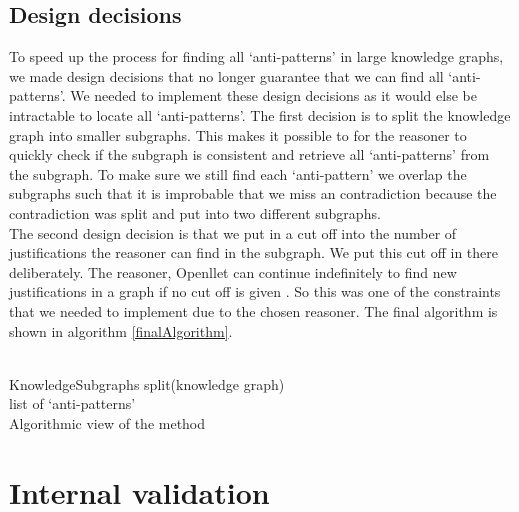 \documentclass[11pt,letterpaper ,oneside ]{book}
\begin{document}
	\section{Design decisions}
	To speed up the process for finding all `anti-patterns' in large knowledge graphs, we made design decisions that no longer guarantee that we can find all `anti-patterns'. We needed to implement these design decisions as it would else be intractable to locate all `anti-patterns'. 
	The first decision is to split the knowledge graph into smaller subgraphs. This makes it possible to for the reasoner to quickly check if the subgraph is consistent and retrieve all `anti-patterns' from the subgraph. To make sure we still find each `anti-pattern' we overlap the subgraphs such that it is improbable that we miss an contradiction because the contradiction was split and put into two different subgraphs.\\
	The second design decision is that we put in a cut off into the number of justifications the reasoner can find in the subgraph. We put this cut off in there deliberately. The reasoner, Openllet can continue indefinitely to find new justifications in a graph if no cut off is given \cite{Openllet:2019}. So this was one of the constraints that we needed to implement due to the chosen reasoner. 
	The final algorithm is shown in algorithm \ref{finalAlgorithm}.\\
	\\
	\begin{algorithm}
		KnowledgeSubgraphs split(knowledge graph)\\
		
		\Return list of `anti-patterns'\\
		\caption{Algorithmic view of the method}
		\label{finalAlgorithm}
	\end{algorithm}
	
	\newpage
	
	\chapter{Internal validation}\label{internalvalidation}
	
\end{document}
